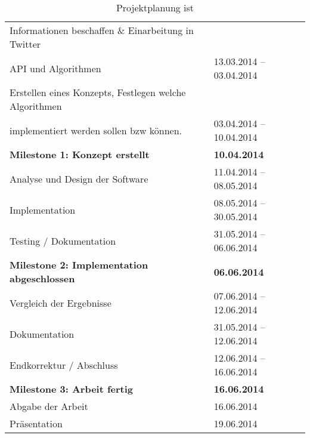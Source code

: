 \begin{table}[H]
\begin{center}
\begin{tabular}{|l|l|}
	\hline
	Informationen beschaffen \& Einarbeitung in Twitter & \\
	API und Algorithmen & 13.03.2014 – 03.04.2014\\ \hline
	Erstellen eines Konzepts, Festlegen welche Algorithmen & \\
	implementiert werden sollen bzw können. & 03.04.2014 – 10.04.2014\\ \hline
	\textbf{Milestone 1: Konzept erstellt} & \textbf{10.04.2014}\\ \hline
	Analyse und Design der Software & 11.04.2014 – 08.05.2014\\ \hline
	Implementation & 08.05.2014 – 30.05.2014\\ \hline
	Testing / Dokumentation & 31.05.2014 – 06.06.2014\\ \hline
	\textbf{Milestone 2: Implementation abgeschlossen} & \textbf{06.06.2014} \\ \hline
	Vergleich der Ergebnisse & 07.06.2014 – 12.06.2014\\ \hline
	Dokumentation & 31.05.2014 – 12.06.2014\\ \hline
	Endkorrektur / Abschluss & 12.06.2014 – 16.06.2014\\ \hline
	\textbf{Milestone 3: Arbeit fertig} & \textbf{16.06.2014} \\ \hline
	Abgabe der Arbeit & 16.06.2014 \\ \hline
	Präsentation & 19.06.2014 \\ \hline
\end{tabular}
\caption{Projektplanung ist}
\end{center}
\end{table}
